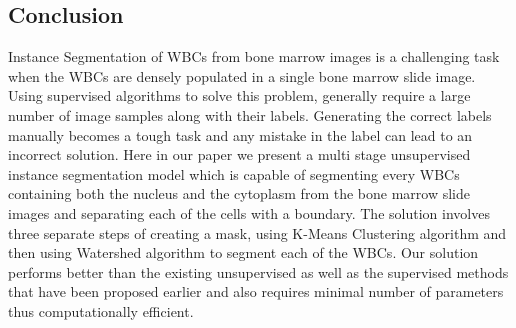 \documentclass[conference]{IEEEtran}
\begin{document}




\subsection{Conclusion}
Instance Segmentation of WBCs from bone marrow images is a challenging task when the WBCs are densely populated in a single bone marrow slide image. Using supervised algorithms to solve this problem, generally require a large number of image samples along with their labels. Generating the correct labels manually becomes a tough task and any mistake in the label can lead to an incorrect solution. Here in our paper we present a multi stage unsupervised instance segmentation model which is capable of segmenting every WBCs containing both the nucleus and the cytoplasm from the bone marrow slide images and separating each of the cells with a boundary. The solution involves three separate steps of creating a mask, using K-Means Clustering algorithm and then using Watershed algorithm to segment each of the WBCs. 
Our solution performs better than the existing unsupervised as well as the supervised methods that have been proposed earlier and also requires minimal number of parameters thus computationally efficient.  
\end{document}
